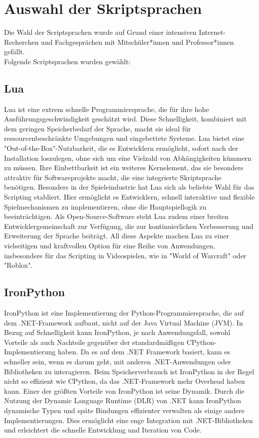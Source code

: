 \section{Auswahl der Skriptsprachen}

Die Wahl der Scriptsprachen wurde auf Grund einer intensiven Internet-Recherchen 
und Fachgesprächen mit Mitschüler*innen und Professor*innen gefällt.\\
Folgende Scriptsprachen wurden gewählt:

\subsection{Lua}
Lua ist eine extrem schnelle Programmiersprache, die für ihre hohe Ausführungsgeschwindigkeit geschätzt wird. 
Diese Schnelligkeit, kombiniert mit dem geringen Speicherbedarf der Sprache, macht sie ideal für ressourcenbeschränkte Umgebungen und eingebettete Systeme. 
Lua bietet eine "Out-of-the-Box"-Nutzbarkeit, die es Entwicklern ermöglicht, sofort nach der Installation loszulegen, ohne sich um eine Vielzahl von Abhängigkeiten kümmern zu müssen. 
Ihre Einbettbarkeit ist ein weiteres Kernelement, das sie besonders attraktiv für Softwareprojekte macht, die eine integrierte Skriptsprache benötigen. Besonders in der Spieleindustrie hat Lua sich als beliebte Wahl für das Scripting etabliert. Hier ermöglicht es Entwicklern, schnell interaktive und flexible Spielmechanismen zu implementieren, ohne die Hauptspiellogik zu beeinträchtigen. 
Als Open-Source-Software steht Lua zudem einer breiten Entwicklergemeinschaft zur Verfügung, die zur kontinuierlichen Verbesserung und Erweiterung der Sprache beiträgt.
All diese Aspekte machen Lua zu einer vielseitigen und kraftvollen Option für eine Reihe von Anwendungen, insbesondere für das Scripting in Videospielen, wie in "World of Warcraft" oder "Roblox".

\newpage
\subsection{IronPython}
IronPython ist eine Implementierung der Python-Programmiersprache, die auf dem .NET-Framework aufbaut, nicht auf der Java Virtual Machine (JVM). 
In Bezug auf Schnelligkeit kann IronPython, je nach Anwendungsfall, sowohl Vorteile als auch Nachteile gegenüber der standardmäßigen CPython-Implementierung haben. 
Da es auf dem .NET Framework basiert, kann es schneller sein, wenn es darum geht, mit anderen .NET-Anwendungen oder Bibliotheken zu interagieren. 
Beim Speicherverbrauch ist IronPython in der Regel nicht so effizient wie CPython, da das .NET-Framework mehr Overhead haben kann. 
Einer der größten Vorteile von IronPython ist seine Dynamik. 
Durch die Nutzung der Dynamic Language Runtime (DLR) von .NET kann IronPython dynamische Typen und späte Bindungen effizienter verwalten als einige andere Implementierungen. 
Dies ermöglicht eine enge Integration mit .NET-Bibliotheken und erleichtert die schnelle Entwicklung und Iteration von Code.

